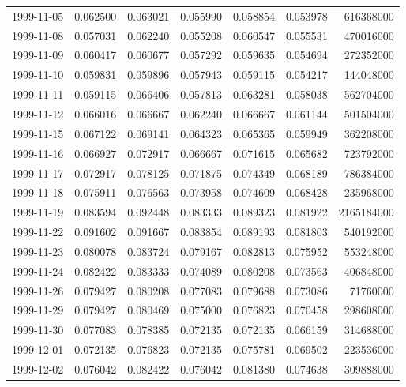 \begin{tabular}{lrrrrrr}
1999-11-05 &    0.062500 &    0.063021 &    0.055990 &    0.058854 &    0.053978 &   616368000 \\
1999-11-08 &    0.057031 &    0.062240 &    0.055208 &    0.060547 &    0.055531 &   470016000 \\
1999-11-09 &    0.060417 &    0.060677 &    0.057292 &    0.059635 &    0.054694 &   272352000 \\
1999-11-10 &    0.059831 &    0.059896 &    0.057943 &    0.059115 &    0.054217 &   144048000 \\
1999-11-11 &    0.059115 &    0.066406 &    0.057813 &    0.063281 &    0.058038 &   562704000 \\
1999-11-12 &    0.066016 &    0.066667 &    0.062240 &    0.066667 &    0.061144 &   501504000 \\
1999-11-15 &    0.067122 &    0.069141 &    0.064323 &    0.065365 &    0.059949 &   362208000 \\
1999-11-16 &    0.066927 &    0.072917 &    0.066667 &    0.071615 &    0.065682 &   723792000 \\
1999-11-17 &    0.072917 &    0.078125 &    0.071875 &    0.074349 &    0.068189 &   786384000 \\
1999-11-18 &    0.075911 &    0.076563 &    0.073958 &    0.074609 &    0.068428 &   235968000 \\
1999-11-19 &    0.083594 &    0.092448 &    0.083333 &    0.089323 &    0.081922 &  2165184000 \\
1999-11-22 &    0.091602 &    0.091667 &    0.083854 &    0.089193 &    0.081803 &   540192000 \\
1999-11-23 &    0.080078 &    0.083724 &    0.079167 &    0.082813 &    0.075952 &   553248000 \\
1999-11-24 &    0.082422 &    0.083333 &    0.074089 &    0.080208 &    0.073563 &   406848000 \\
1999-11-26 &    0.079427 &    0.080208 &    0.077083 &    0.079688 &    0.073086 &    71760000 \\
1999-11-29 &    0.079427 &    0.080469 &    0.075000 &    0.076823 &    0.070458 &   298608000 \\
1999-11-30 &    0.077083 &    0.078385 &    0.072135 &    0.072135 &    0.066159 &   314688000 \\
1999-12-01 &    0.072135 &    0.076823 &    0.072135 &    0.075781 &    0.069502 &   223536000 \\
1999-12-02 &    0.076042 &    0.082422 &    0.076042 &    0.081380 &    0.074638 &   309888000 \\

\end{tabular}
